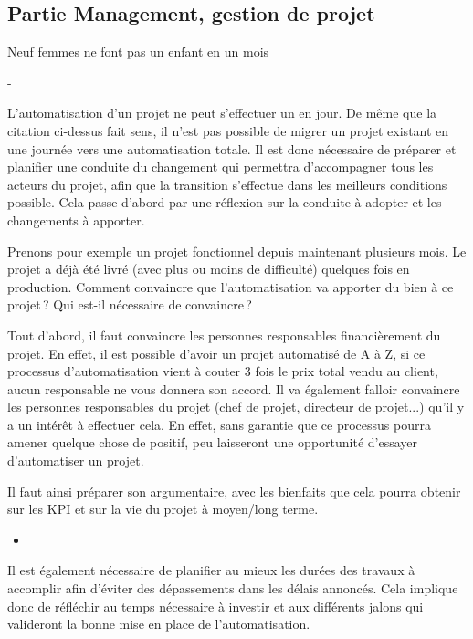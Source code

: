 
\subsection{Partie Management, gestion de projet}


\epigraph{Neuf femmes ne font pas un enfant en un mois}{ - \citeauthor{manmonth} \cite{manmonth}}

L'automatisation d'un projet ne peut s'effectuer un en jour. De même que la citation ci-dessus fait sens, il n'est pas possible de migrer un projet existant en une journée vers une automatisation totale. Il est donc nécessaire de préparer et planifier une conduite du changement qui permettra d'accompagner tous les acteurs du projet, afin que la transition s'effectue dans les meilleurs conditions possible. Cela passe d'abord par une réflexion sur la conduite à adopter et les changements à apporter. 

Prenons pour exemple un projet fonctionnel depuis maintenant plusieurs mois. Le projet a déjà été livré (avec plus ou moins de difficulté) quelques fois en production. Comment convaincre que l'automatisation va apporter du bien à ce projet ? Qui est-il nécessaire de convaincre ?

Tout d'abord, il faut convaincre les personnes responsables financièrement du projet. En effet, il est possible d'avoir un projet automatisé de A à Z, si ce processus d'automatisation vient à couter 3 fois le prix total vendu au client, aucun responsable ne vous donnera son accord. Il va également falloir convaincre les personnes responsables du projet (chef de projet, directeur de projet...) qu'il y a un intérêt à effectuer cela. En effet, sans garantie que ce processus pourra amener quelque chose de positif, peu laisseront une opportunité d'essayer d'automatiser un projet.


Il faut ainsi préparer son argumentaire, avec les bienfaits que cela pourra obtenir sur les \gls{KPI} et sur la vie du projet à moyen/long terme.

\begin{itemize}
	\item {}
\end{itemize}

Il est également nécessaire de planifier au mieux les durées des travaux à accomplir afin d'éviter des dépassements dans les délais annoncés. Cela implique donc de réfléchir au temps nécessaire à investir et aux différents jalons qui valideront la bonne mise en place de l'automatisation. 

